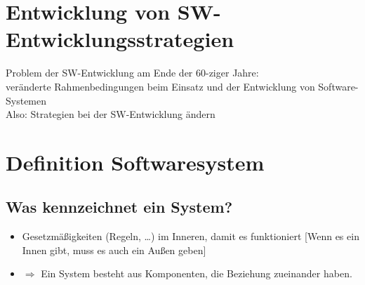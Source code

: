 \documentclass{scrreprt}
\begin{document}

\section{Entwicklung von SW-Entwicklungsstrategien}
Problem der SW-Entwicklung am Ende der 60-ziger Jahre:\\
veränderte Rahmenbedingungen beim Einsatz und der Entwicklung von Software-Systemen\\
Also: Strategien bei der SW-Entwicklung ändern

\section{Definition Softwaresystem}
\subsection{Was kennzeichnet ein System?}
\begin{itemize}
\item Gesetzmäßigkeiten (Regeln, …) im Inneren, damit es funktioniert [Wenn es ein Innen gibt, muss es auch ein Außen geben]
\item $\Rightarrow$ Ein System besteht aus Komponenten, die Beziehung zueinander haben.
\end{itemize}
\end{document}
